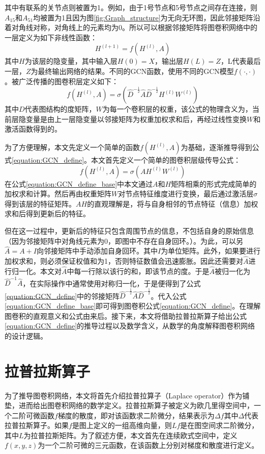 其中有联系的关节点则被置为1。例如，由于1号节点和5号节点之间存在连接，则$A_{15}$和$A_{51}$均被置为1且因为图\ref{fig:Graph_structure}为无向无环图，因此邻接矩阵沿着对角线对称，对角线上的元素均为0。所以可以根据邻接矩阵将图卷积网络中的一层定义为如下非线性函数：
\begin{equation}
   H^{(l+1)} = f(H^{(l)} ,A)
    \label{equation:GCN_simple_define}
\end{equation}
其中$H$为该层的隐变量，其中输入层$H(0)=X$，输出层$H(L)=Z$，L代表最后一层，$Z$为最终输出网络的结果。不同的GCN函数，使用不同的GCN模型$f(\cdot,\cdot)$。被广泛传播的图卷积层定义如下：
\begin{equation}
    f(H^{(l)},A) = \sigma\left( \hat{D}^{-\frac{1}{2}} \hat{A} \hat{D}^{-\frac{1}{2}} H^{(l)}W^{(l)} \right)
    \label{equation:GCN_define}
 \end{equation}
其中$D$代表图结构的度矩阵，$W$为每一个卷积层的权重，该公式的物理含义为，当前层隐变量是由上一层隐变量以邻接矩阵为权重加权求和后，再经过线性变换$W$和激活函数得到的。

为了方便理解，本文先定义一个简单的函数$f(H^{(l)},A)$为基础，逐渐推导得到公式\ref{equation:GCN_define}。本文首先定义一个简单的图卷积层级传导公式：
\begin{equation}
    f(H^{(l)},A) = \sigma\left( {A}H^{(l)}W^{(l)} \right)
    \label{equation:GCN_define_base}
 \end{equation}
 在公式\ref{equation:GCN_define_base}中本文通过$A$和$H$矩阵相乘的形式完成简单的加权求和计算。然后再由权重矩阵$W$对节点特征维度进行变换，最后通过激活层$\sigma$得到该层的特征矩阵。$AH$的直观理解是，将与自身相邻的节点特征（信息）加权求和后得到更新后的特征。

 但在这一过程中，更新后的特征只包含周围节点的信息，不包括自身的原始信息（因为邻接矩阵中对角线元素为0，即图中不存在自身回环。）。为此，可以另$\hat{A} = A + I$向邻接矩阵中手动添加自身回环。其中$I$为单位矩阵。此外，如果要进行加权求和，则必须保证权值和为1，否则特征数值会迅速膨胀。因此还需要对$\hat{A}$进行归一化。本文对$\hat{A}$中每一行除以该行的和，即该节点的度。于是$\hat{A}$被归一化为$\hat{D}^{-1}\hat{A}$，在实际操作中通常使用对称归一化，于是便得到了公式\ref{equation:GCN_define}中的邻接矩阵$\hat{D}^{-\frac{1}{2}}\hat{A}\hat{D}^{-\frac{1}{2}}$。代入公式\ref{equation:GCN_define_base}即可得到图卷积公式\ref{equation:GCN_define}。在理解图卷积的直观意义和公式由来后。接下来，本文将借助拉普拉斯算子给出公式\ref{equation:GCN_define}的推导过程以及数学含义，从数学的角度解释图卷积网络的设计逻辑。
\section{拉普拉斯算子}
为了推导图卷积网络，本文将首先介绍拉普拉算子（Laplace operator）作为铺垫，进而给出图卷积网络的数学定义。拉普拉斯算子被定义为欧几里得空间中，一个二阶可微函数$f$梯度的散度，即对该函数求二阶微分，结果表示为$\Delta f$其中$\Delta$代表拉普拉斯算子。如果$f$是图上定义的一组高维向量，则$Lf$是在图空间求二阶微分，其中$L$为拉普拉斯矩阵。为了叙述方便，本文首先在连续欧式空间中，定义$f(x,y,z)$为一个二阶可微的三元函数，在该函数上分别对梯度和散度进行定义。

